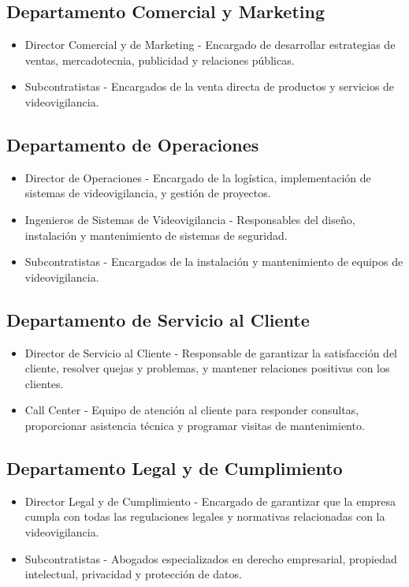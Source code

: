 \documentclass{report}
\begin{document}
          \subsection{Departamento Comercial y Marketing}
            \begin{itemize}
            \item Director Comercial y de Marketing - Encargado de desarrollar estrategias de ventas, mercadotecnia, publicidad y relaciones públicas.
            \item Subcontratistas - Encargados de la venta directa de productos y servicios de videovigilancia.
            \end{itemize}
          \subsection{Departamento de Operaciones}
            \begin{itemize}
            \item Director de Operaciones - Encargado de la logística, implementación de sistemas de videovigilancia, y gestión de proyectos.
            \item Ingenieros de Sistemas de Videovigilancia - Responsables del diseño, instalación y mantenimiento de sistemas de seguridad.
            \item Subcontratistas - Encargados de la instalación y mantenimiento de equipos de videovigilancia.
            \end{itemize}
          \subsection{Departamento de Servicio al Cliente}
            \begin{itemize}
            \item Director de Servicio al Cliente - Responsable de garantizar la satisfacción del cliente, resolver quejas y problemas, y mantener relaciones positivas con los clientes.
            \item Call Center - Equipo de atención al cliente para responder consultas, proporcionar asistencia técnica y programar visitas de mantenimiento.
            \end{itemize}
          \subsection{Departamento Legal y de Cumplimiento}
            \begin{itemize}
            \item Director Legal y de Cumplimiento - Encargado de garantizar que la empresa cumpla con todas las regulaciones legales y normativas relacionadas con la videovigilancia.
            \item Subcontratistas - Abogados especializados en derecho empresarial, propiedad intelectual, privacidad y protección de datos.
            \end{itemize}
\end{document}
